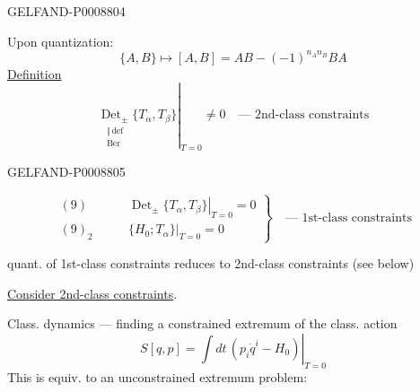 \begin{GelfandAdjacentEvidence}{GELFAND-P000880}{4}


Upon quantization:
\begin{equation*}
\{A,B\}\mapsto[A,B]=AB-(-1)^{n_A n_B}BA
\tag{7}
\end{equation*}
\uline{Definition}
\begin{equation*}
\left.\underset{\substack{\Vert\,\mathrm{def}\\\mathrm{Ber}}}{\operatorname{Det}_{\pm}}\{T_\alpha,T_\beta\}\right|_{T=0}\ne0
\quad\text{--- 2nd-class constraints}
\tag{8}
\end{equation*}
\end{GelfandAdjacentEvidence}
\begin{GelfandAdjacentEvidence}{GELFAND-P000880}{5}

\begin{equation*}
\left.
\begin{aligned}
(9)\qquad &\left.\operatorname{Det}_{\pm}\{T_\alpha,T_\beta\}\right|_{T=0}=0\\
(9)_2\qquad &\left.\{H_0;T_\alpha\}\right|_{T=0}=0
\end{aligned}
\right\}\quad\text{--- 1st-class constraints}
\end{equation*}
\end{GelfandAdjacentEvidence}


quant. of 1st-class constraints reduces to 2nd-class constraints (see below)

\uline{Consider 2nd-class constraints}.

Class. dynamics --- finding a constrained extremum of the class. action
\begin{equation*}
S[q,p]=\left.\int dt\,(p_i\dot q^i-H_0)\right|_{T=0}
\tag{10}
\end{equation*}
This is equiv. to an unconstrained extremum problem:


